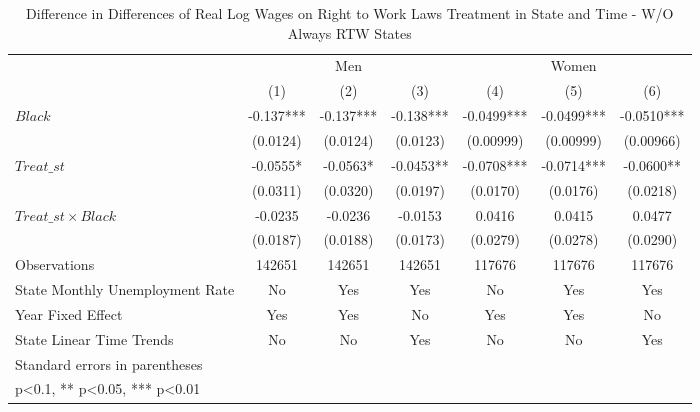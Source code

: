 \begin{table}[htbp]\centering
\def\sym#1{\ifmmode^{#1}\else\(^{#1}\)\fi}
\caption{Difference in Differences of Real Log Wages on Right to Work Laws Treatment in State and Time - W/O Always RTW States}
\begin{tabular}{l*{6}{c}}
\hline\hline
                    &\multicolumn{3}{c}{Men}                        &\multicolumn{3}{c}{Women}                      \\\cmidrule(lr){2-4}\cmidrule(lr){5-7}
                    &\multicolumn{1}{c}{(1)}   &\multicolumn{1}{c}{(2)}   &\multicolumn{1}{c}{(3)}   &\multicolumn{1}{c}{(4)}   &\multicolumn{1}{c}{(5)}   &\multicolumn{1}{c}{(6)}   \\
\hline
$ Black $           &      -0.137***&      -0.137***&      -0.138***&     -0.0499***&     -0.0499***&     -0.0510***\\
                    &    (0.0124)   &    (0.0124)   &    (0.0123)   &   (0.00999)   &   (0.00999)   &   (0.00966)   \\
[1em]
$ Treat\_{st} $      &     -0.0555*  &     -0.0563*  &     -0.0453** &     -0.0708***&     -0.0714***&     -0.0600** \\
                    &    (0.0311)   &    (0.0320)   &    (0.0197)   &    (0.0170)   &    (0.0176)   &    (0.0218)   \\
[1em]
$ Treat\_{st} \times Black $&     -0.0235   &     -0.0236   &     -0.0153   &      0.0416   &      0.0415   &      0.0477   \\
                    &    (0.0187)   &    (0.0188)   &    (0.0173)   &    (0.0279)   &    (0.0278)   &    (0.0290)   \\
\hline
Observations        &      142651   &      142651   &      142651   &      117676   &      117676   &      117676   \\
State Monthly Unemployment Rate&          No   &         Yes   &         Yes   &          No   &         Yes   &         Yes   \\
Year Fixed Effect   &         Yes   &         Yes   &          No   &         Yes   &         Yes   &          No   \\
State Linear Time Trends&          No   &          No   &         Yes   &          No   &          No   &         Yes   \\
\hline\hline
\multicolumn{7}{l}{\footnotesize Standard errors in parentheses}\\
\multicolumn{7}{l}{\footnotesize * p<0.1, ** p<0.05, *** p<0.01}\\
\end{tabular}
\end{table}
